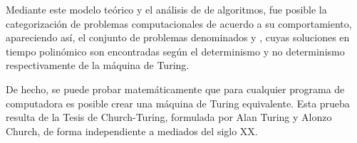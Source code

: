 \documentclass[12pt,a4paper,spanish]{book}
\begin{document}
\begin{itemize}
Mediante este modelo te\'orico y el an\'alisis de  de algoritmos, fue posible la categorizaci\'on de problemas computacionales de acuerdo a su comportamiento, apareciendo as\'i, el conjunto de problemas denominados  y , cuyas soluciones en tiempo polin\'omico son encontradas seg\'un el determinismo y no determinismo respectivamente de la m\'aquina de Turing.

De hecho, se puede probar matem\'aticamente que para cualquier programa de computadora es posible crear una m\'aquina de Turing equivalente. Esta prueba resulta de la Tesis de Church-Turing, formulada por Alan Turing y Alonzo Church, de forma independiente a mediados del siglo XX.


\end{itemize}
\end{document}
